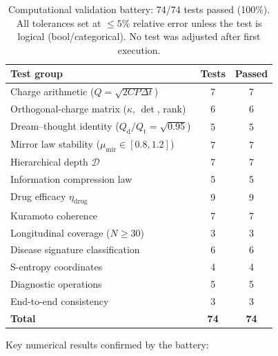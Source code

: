 \documentclass[11pt,twocolumn,a4paper]{article}
\theoremstyle{definition}
\theoremstyle{remark}
\newcommand{\Qt}{Q_{\mathrm{t}}}
\newcommand{\Qd}{Q_{\mathrm{d}}}
\newcommand{\Dhier}{\mathcal{D}}
\newcommand{\etadrug}{\eta_{\mathrm{drug}}}
\newcommand{\munir}{\mu_{\mathrm{mir}}}
\begin{document}
\begin{table}[H]
\centering
\small
\begin{tabular}{lcc}
\toprule
\textbf{Test group} & \textbf{Tests} & \textbf{Passed} \\
\midrule
Charge arithmetic ($Q = \sqrt{2C P \Delta t}$) & 7 & 7 \\
Orthogonal-charge matrix ($\kappa$, $\det$, rank) & 6 & 6 \\
Dream--thought identity ($\Qd/\Qt = \sqrt{0.95}$) & 5 & 5 \\
Mirror law stability ($\munir \in [0.8, 1.2]$) & 7 & 7 \\
Hierarchical depth $\Dhier$ & 7 & 7 \\
Information compression law & 5 & 5 \\
Drug efficacy $\etadrug$ & 9 & 9 \\
Kuramoto coherence & 7 & 7 \\
Longitudinal coverage ($N \geq 30$) & 3 & 3 \\
Disease signature classification & 6 & 6 \\
S-entropy coordinates & 4 & 4 \\
Diagnostic operations & 5 & 5 \\
End-to-end consistency & 3 & 3 \\
\midrule
\textbf{Total} & \textbf{74} & \textbf{74} \\
\bottomrule
\end{tabular}
\caption{Computational validation battery: 74/74 tests passed (100\%).
All tolerances set at $\leq 5\%$ relative error unless the test is
logical (bool/categorical). No test was adjusted after first
execution.}
\label{tab:validation-battery}
\end{table}

Key numerical results confirmed by the battery:
\end{document}
